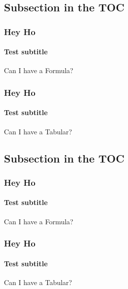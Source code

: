 \documentclass[german,aspectratio=169,notoc]{tudbeamer}%
\begin{document}
\subsection{Subsection in the TOC}
\begin{frame}
	\frametitle{Hey Ho}
	\framesubtitle{Test subtitle}
	Can I have a Formula?
\end{frame}
\begin{frame}
	\frametitle{Hey Ho}
	\framesubtitle{Test subtitle}
	Can I have a Tabular?
\end{frame}

\subsection{Subsection in the TOC}
\begin{frame}
	\frametitle{Hey Ho}
	\framesubtitle{Test subtitle}
	Can I have a Formula?
\end{frame}
\begin{frame}
	\frametitle{Hey Ho}
	\framesubtitle{Test subtitle}
	Can I have a Tabular?
\end{frame}
\end{document}
